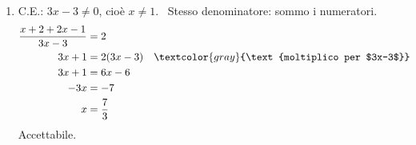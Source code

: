 \begin{question}[ID=3.3, subtitle={Equazioni frazionarie}, difficulty=facile, tags={equazioni frazionarie}]
\begin{explanation}
\begin{enumerate}
    Accettabile.
    \item C.E.: $3x-3\neq0$, cioè $x\neq1$. \ Stesso denominatore: sommo i numeratori.
    \[\begin{aligned}
    \dfrac{x+2+2x-1}{3x-3} &= 2\\
    3x+1 &= 2(3x-3) && \textcolor{gray}{\text{moltiplico per $3x-3$}}\\
    3x+1 &= 6x-6\\
    -3x &= -7\\
    x &= \dfrac73
    \end{aligned}\]
    Accettabile.
\end{enumerate}
\end{explanation}
\end{question}



